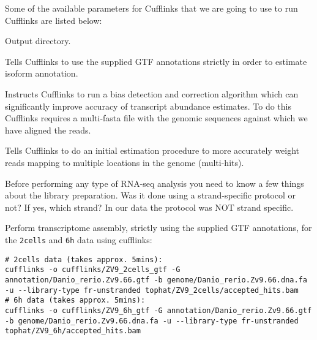 \begin{note}
Some of the available parameters for Cufflinks that we are going to use to run
Cufflinks are listed below:
\begin{description}[style=multiline,labelindent=0cm,align=right,leftmargin=\descriptionlabelspace,rightmargin=1.5cm,font=\ttfamily]
  \item[-o] Output directory.
  \item[-G] Tells Cufflinks to use the supplied GTF annotations strictly in order
  to estimate isoform annotation.
  \item[-b] Instructs Cufflinks to run a bias detection and correction algorithm
  which can significantly improve accuracy of transcript abundance estimates.
  To do this Cufflinks requires a multi-fasta file with the genomic sequences
  against which we have aligned the reads.
  \item[-u] Tells Cufflinks to do an initial estimation procedure to more
  accurately weight reads mapping to multiple locations in the genome
  (multi-hits).
  \item[--library-type] Before performing any type of RNA-seq analysis you need
  to know a few things about the library preparation. Was it done using a
  strand-specific protocol or not? If yes, which strand? In our data the protocol
  was NOT strand specific.
\end{description}
\end{note}

\begin{steps}
Perform transcriptome assembly, strictly using the supplied GTF annotations, for the \texttt{2cells} and \texttt{6h} data using cufflinks:
\begin{lstlisting}
# 2cells data (takes approx. 5mins):
cufflinks -o cufflinks/ZV9_2cells_gtf -G annotation/Danio_rerio.Zv9.66.gtf -b genome/Danio_rerio.Zv9.66.dna.fa -u --library-type fr-unstranded tophat/ZV9_2cells/accepted_hits.bam
# 6h data (takes approx. 5mins):
cufflinks -o cufflinks/ZV9_6h_gtf -G annotation/Danio_rerio.Zv9.66.gtf -b genome/Danio_rerio.Zv9.66.dna.fa -u --library-type fr-unstranded tophat/ZV9_6h/accepted_hits.bam
\end{lstlisting}
\end{steps}

